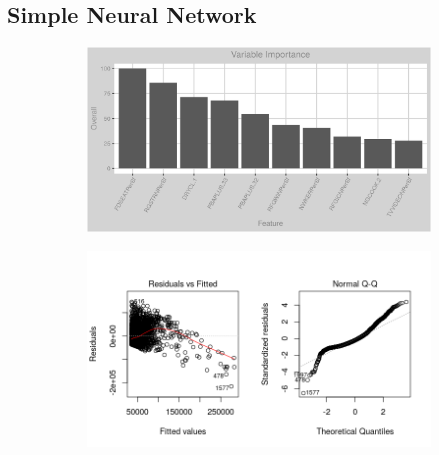 \subsection{Simple Neural Network}
\label{appendix:natural_gas:snn}
\begin{figure}[h]
\centering
\begin{subfigure}{1\textwidth}
\centering
\includegraphics[width=.99\textwidth, height=0.35\textheight]{Images/natural_gas_psf_nn_vars.png}
\end{subfigure}
\begin{subfigure}{1\textwidth}
\centering
\includegraphics[width=.99\textwidth, height=0.4\textheight]{Images/natural_gas_psf_nn_res_1.png}
\end{subfigure}
\end{figure}
\FloatBarrier
\newpage
